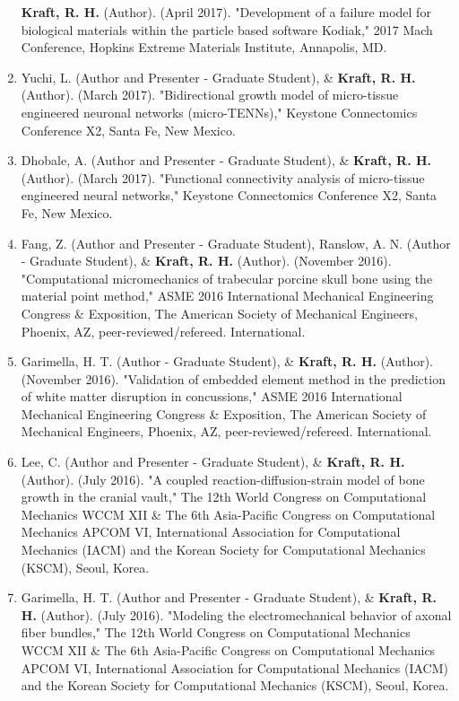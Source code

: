 \documentclass[a4paper,10pt]{article}
\begin{document}
\begin{enumerate}
 \textbf{\textbf{Kraft,} R. H.} (Author). (April 2017). "Development of a failure model for biological materials within the particle based software Kodiak," 2017 Mach Conference, Hopkins Extreme Materials Institute, Annapolis, MD.
  \item Yuchi, L. (Author and Presenter - Graduate Student), \&
 \textbf{\textbf{Kraft,} R. H.} (Author). (March 2017). "Bidirectional growth model of micro-tissue engineered neuronal networks (micro-TENNs)," Keystone Connectomics Conference X2, Santa Fe, New Mexico.
  \item Dhobale, A. (Author and Presenter - Graduate Student), \&
 \textbf{\textbf{Kraft,} R. H.} (Author). (March 2017). "Functional connectivity analysis of micro-tissue engineered neural networks," Keystone Connectomics Conference X2, Santa Fe, New Mexico.
  \item Fang, Z. (Author and Presenter - Graduate Student), Ranslow, A. N. (Author - Graduate Student), \&
 \textbf{\textbf{Kraft,} R. H.} (Author). (November 2016). "Computational micromechanics of trabecular porcine skull bone using the material point method," ASME 2016 International Mechanical Engineering Congress \&
 Exposition, The American Society of Mechanical Engineers, Phoenix, AZ, peer-reviewed/refereed. International.
  \item Garimella, H. T. (Author - Graduate Student), \&
 \textbf{\textbf{Kraft,} R. H.} (Author). (November 2016). "Validation of embedded element method in the prediction of white matter disruption in concussions," ASME 2016 International Mechanical Engineering Congress \&
 Exposition, The American Society of Mechanical Engineers, Phoenix, AZ, peer-reviewed/refereed. International.
  \item Lee, C. (Author and Presenter - Graduate Student), \&
 \textbf{\textbf{Kraft,} R. H.} (Author). (July 2016). "A coupled reaction-diffusion-strain model of bone growth in the cranial vault," The 12th World Congress on Computational Mechanics WCCM XII \&
 The 6th Asia-Pacific Congress on Computational Mechanics APCOM VI, International Association for Computational Mechanics (IACM) and the Korean Society for Computational Mechanics (KSCM), Seoul, Korea.
  \item Garimella, H. T. (Author and Presenter - Graduate Student), \&
 \textbf{\textbf{Kraft,} R. H.} (Author). (July 2016). "Modeling the electromechanical behavior of axonal fiber bundles," The 12th World Congress on Computational Mechanics WCCM XII \&
 The 6th Asia-Pacific Congress on Computational Mechanics APCOM VI, International Association for Computational Mechanics (IACM) and the Korean Society for Computational Mechanics (KSCM), Seoul, Korea.

\end{enumerate}
\end{document}
